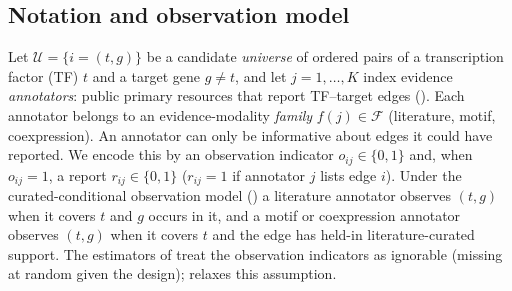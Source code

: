 \documentclass[11pt,a4paper]{article}
\begin{document}
\subsection{Notation and observation model}\label{sec:notation}
Let $\mathcal{U}=\{i=(t,g)\}$ be a candidate \emph{universe} of ordered pairs of a transcription factor (TF) $t$ and a target gene $g\neq t$, and let $j=1,\dots,K$ index evidence \emph{annotators}: public primary resources that report TF--target edges ().
Each annotator belongs to an evidence-modality \emph{family} $f(j)\in\mathcal{F}$ (literature, motif, coexpression).
An annotator can only be informative about edges it could have reported. We encode this by an observation indicator $o_{ij}\in\{0,1\}$ and, when $o_{ij}=1$, a report $r_{ij}\in\{0,1\}$ ($r_{ij}=1$ if annotator $j$ lists edge $i$).
Under the curated-conditional observation model () a literature annotator observes $(t,g)$ when it covers $t$ and $g$ occurs in it, and a motif or coexpression annotator observes $(t,g)$ when it covers $t$ and the edge has held-in literature-curated support.
The estimators of  treat the observation indicators as ignorable (missing at random given the design);  relaxes this assumption.
\end{document}
